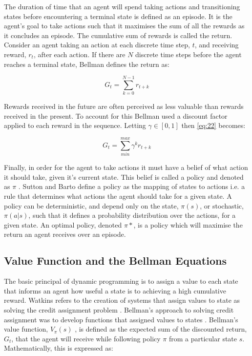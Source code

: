 The duration of time that an agent will spend taking actions and transitioning states before encountering a terminal state is defined as an episode. It is the agent's goal to take actions such that it maximises the sum of all the rewards as it concludes an episode. The cumulative sum of rewards is called the return. Consider an agent taking an action at each discrete time step, $t$, and receiving reward, $r_t$, after each action. If there are $N$ discrete time steps before the agent reaches a terminal state, Bellman defines the return as:

\begin{equation}
	G_t = \sum_{k = 0}^{N-1} r_{t + k} \label{eq:22}
\end{equation}

Rewards received in the future are often perceived as less valuable than rewards received in the present. To account for this Bellman used a discount factor applied to each reward in the sequence. Letting $\gamma \in [0,1]$ then \ref{eq:22} becomes:

\begin{equation}
	G_t = \sum_{min}^{max}\gamma^k r_{t+k} \label{eq:23}
\end{equation}

Finally, in order for the agent to take actions it must have a belief of what action it should take, given it's current state. This belief is called a policy and denoted as $\pi$ \cite{Sutton2018}. Sutton and Barto define a  policy as the mapping of states to actions i.e. a rule that determines what actions the agent should take for a given state. A policy can be deterministic, and depend only on the state, $\pi(s)$, or stochastic, $\pi(a|s)$, such that it defines a probability distribution over the actions, for a given state. An optimal policy, denoted $\pi*$, is a policy which will maximise the return an agent receives over an episode.

\subsection{Value Function and the Bellman Equations}
The basic principal of dynamic programming is to assign a value to each state that informs an agent how useful a state is to achieving a high cumulative reward. Watkins refers to the creation of systems that assign values to state as solving the credit assignment problem \cite{Watkin1989}. Bellman's approach to solving credit assignment was to develop functions that assigned values to states \cite{Bellm1954}. Bellman's value function, $V_{\pi}(s)$ , is defined as the expected sum of the discounted return, $G_t$, that the agent will receive while following policy $\pi$ from a particular state $s$. Mathematically, this is expressed as:

